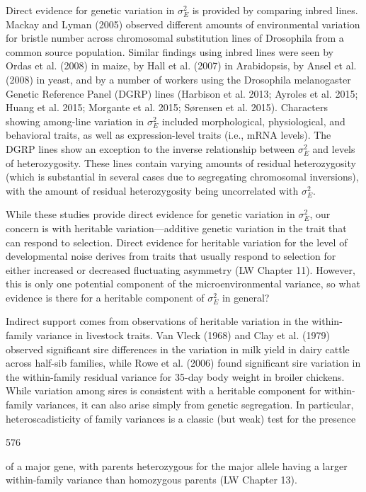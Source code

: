 \documentclass{article}
\begin{document}
Direct evidence for genetic variation in  $ \sigma_E^2 $ is provided by comparing inbred lines. Mackay and Lyman (2005) observed different amounts of environmental variation for bristle number across chromosomal substitution lines of Drosophila from a common source population. Similar findings using inbred lines were seen by Ordas et al. (2008) in maize, by Hall et al. (2007) in Arabidopsis, by Ansel et al. (2008) in yeast, and by a number of workers using the Drosophila melanogaster Genetic Reference Panel (DGRP) lines (Harbison et al. 2013; Ayroles et al. 2015; Huang et al. 2015; Morgante et al. 2015; Sørensen et al. 2015). Characters showing among-line variation in  $ \sigma_E^2 $ included morphological, physiological, and behavioral traits, as well as expression-level traits (i.e., mRNA levels). The DGRP lines show an exception to the inverse relationship between  $ \sigma_E^2 $ and levels of heterozygosity. These lines contain varying amounts of residual heterozygosity (which is substantial in several cases due to segregating chromosomal inversions), with the amount of residual heterozygosity being uncorrelated with  $ \sigma_E^2 $.

While these studies provide direct evidence for genetic variation in  $ \sigma_{E}^{2} $, our concern is with heritable variation—additive genetic variation in the trait that can respond to selection. Direct evidence for heritable variation for the level of developmental noise derives from traits that usually respond to selection for either increased or decreased fluctuating asymmetry (LW Chapter 11). However, this is only one potential component of the microenvironmental variance, so what evidence is there for a heritable component of  $ \sigma_{E}^{2} $ in general?

Indirect support comes from observations of heritable variation in the within-family variance in livestock traits. Van Vleck (1968) and Clay et al. (1979) observed significant sire differences in the variation in milk yield in dairy cattle across half-sib families, while Rowe et al. (2006) found significant sire variation in the within-family residual variance for 35-day body weight in broiler chickens. While variation among sires is consistent with a heritable component for within-family variances, it can also arise simply from genetic segregation. In particular, heteroscadisticity of family variances is a classic (but weak) test for the presence

576

of a major gene, with parents heterozygous for the major allele having a larger within-family variance than homozygous parents (LW Chapter 13).
\end{document}
